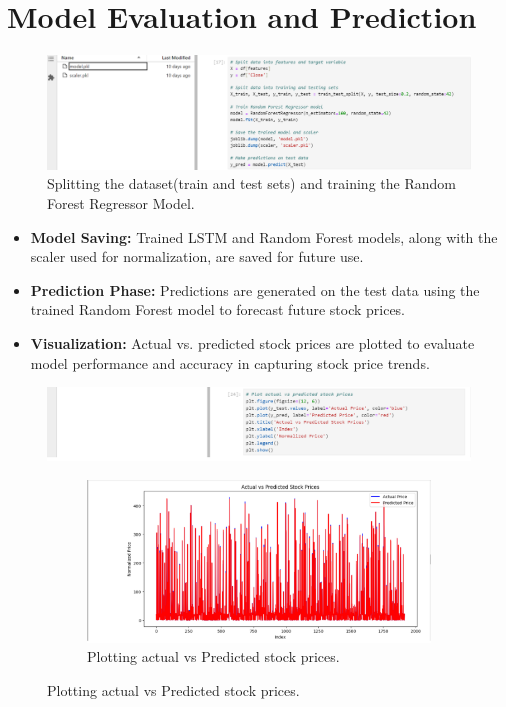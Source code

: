 \documentclass{article}
\begin{document}
\section{Model Evaluation and Prediction}
\begin{figure}
    \centering
    \includegraphics[width=1\linewidth]{Capture15.PNG}
    \caption{Splitting the dataset(train and test sets) and training the Random Forest Regressor Model.}
    \label{fig:enter-label}
\end{figure}
\begin{itemize}
    \item {\bfseries Model Saving:} Trained LSTM and Random Forest models, along with the scaler used for normalization, are saved for future use.
    \item {\bfseries Prediction Phase:} Predictions are generated on the test data using the trained Random Forest model to forecast future stock prices.
    \item {\bfseries Visualization:} Actual vs. predicted stock prices are plotted to evaluate model performance and accuracy in capturing stock price trends.
\end{itemize}

\begin{figure}
    \centering
    
    \includegraphics[width=1\linewidth]{Capture16.PNG}
    \begin{subfigure}
        \centering
        \includegraphics[width=\linewidth]{Capture17.PNG}
        \caption{Plotting actual vs Predicted stock prices.}
        \label{fig:subfig_a}
    \end{subfigure}
   
\end{figure}
\end{document}
